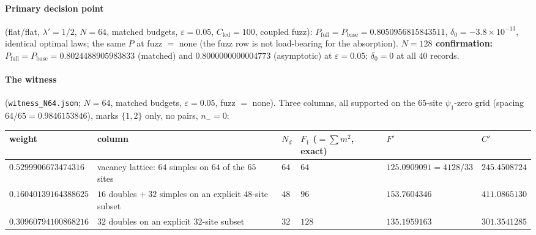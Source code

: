 \documentclass[11pt]{article}
\theoremstyle{plain}
\theoremstyle{definition}
\theoremstyle{remark}
\newcommand{\Cled}{C_{\mathrm{led}}}
\newcommand{\Nd}{N_{d}}
\begin{document}
\paragraph{Primary decision point}
(flat/flat, $\lambda' = 1/2$, $N = 64$, matched budgets, $\varepsilon = 0.05$,
$\Cled = 100$, coupled fuzz):
$P_{\mathrm{full}} = P_{\mathrm{base}} = 0.8050956815843511$,
$\delta_0 = -3.8 \times 10^{-13}$, identical optimal laws; the same $P$ at
fuzz $=$ none (the fuzz row is not load-bearing for the absorption).
\textbf{$N = 128$ confirmation:}
$P_{\mathrm{full}} = P_{\mathrm{base}} = 0.8024488905983833$ (matched) and
$0.8000000000004773$ (asymptotic) at $\varepsilon = 0.05$; $\delta_0 = 0$ at all
$40$ records.

\paragraph{The witness}
(\texttt{witness\_N64.json}; $N = 64$, matched budgets, $\varepsilon = 0.05$,
fuzz $=$ none). Three columns, all supported on the $65$-site $\psi_1$-zero grid
(spacing $64/65 = 0.9846153846$), marks $\{1, 2\}$ only, no pairs, $n_- = 0$:

\begin{table}[h]
\centering
\footnotesize
\begin{tabular}{@{}>{\raggedright\arraybackslash}p{3.1cm}
                  >{\raggedright\arraybackslash}p{3.0cm} l
                  >{\raggedright\arraybackslash}p{1.9cm}
                  >{\raggedright\arraybackslash}p{2.7cm} l@{}}
\toprule
weight & column & $\Nd$ & $F_1$ ($= \sum m^2$, exact) & $F'$ & $C'$ \\
\midrule
$0.5299906673474316$ &
vacancy lattice: $64$ simples on $64$ of the $65$ sites &
$64$ & $64$ & $125.0909091 = 4128/33$ & $245.4508724$ \\
\addlinespace
$0.16040139164388625$ &
$16$ doubles $+\ 32$ simples on an explicit $48$-site subset &
$48$ & $96$ & $153.7604346$ & $411.0865130$ \\
\addlinespace
$0.30960794100868216$ &
$32$ doubles on an explicit $32$-site subset &
$32$ & $128$ & $135.1959163$ & $301.3541285$ \\
\bottomrule
\end{tabular}
\end{table}
\end{document}
